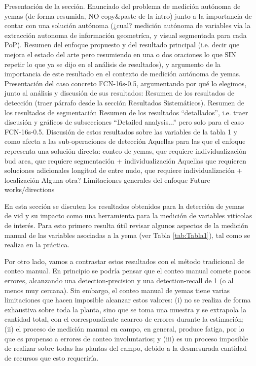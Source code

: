\documentclass[a4paper,authoryear,review]{elsarticle}
\begin{document}
Presentación de la sección.
Enunciado del problema de medición autónoma de yemas (de forma resumida, NO copy\&paste de la intro) junto a la importancia de contar con una solución autónoma (¿cual? medición autónoma de variables vía la extracción autonoma de información geometríca, y visual segmentada para cada PoP).
Resumen del enfoque propuesto y del resultado principal (i.e. decir que mejora el estado del arte pero resumiendo en una o dos oraciones lo que SIN repetir lo que ya se dijo en el análisis de resultados), y argumento de la importancia de este resultado en el contexto de medición autónoma de yemas.
Presentación del caso concreto FCN-16s-0.5, argumentando por qué lo elegimos, junto al análisis y discusión de sus resultados:
Resumen de los resultados de detección (traer párrafo desde la sección Resultados Sistemáticos).
Resumen de los resultados de segmentación
Resumen de los resultados “detallados”, i.e. traer discusión y gráficos de subsecciones “Detailed analysis...” pero solo para el caso FCN-16s-0.5.
Discusión de estos resultados sobre las variables de la tabla 1 y como afecta a las sub-operaciones de detección 
Aquellas para las que el enfoque representa una solución directa:
conteo de yemas, que requiere individualización
bud area, que requiere segmentación + individualización
Aquellas que requieren soluciones adicionales
longitud de entre nudo, que requiere individualización + localización
Alguna otra?
Limitaciones generales del enfoque
Future works/directions



En esta sección se discuten los resultados obtenidos para la detección de yemas de vid y su impacto como una herramienta para la medición de variables vitícolas de interés. Para esto primero resulta útil revisar algunos aspectos de la medición manual de las variables asociadas a la yema (ver Tabla \ref{tab:Tabla1}), tal como se realiza en la práctica. 



Por otro lado, vamos a contrastar estos resultados con el método tradicional de conteo manual. En principio se podría pensar que el conteo manual comete pocos errores, alcanzando una detection-precision y una detection-recall de 1 (o al menos muy cercana). Sin embargo, el conteo manual de yemas tiene varias limitaciones que hacen imposible alcanzar estos valores: (i) no se realiza de forma exhaustiva sobre toda la planta, sino que se toma una muestra y se extrapola la cantidad total, con el correspondiente acarreo de errores durante la estimación; (ii) el proceso de medición manual en campo, en general, produce fatiga, por lo que es propenso a errores de conteo involuntarios; y (iii) es un proceso imposible de realizar sobre todas las plantas del campo, debido a la desmesurada cantidad de recursos que esto requeriría. 
\end{document}
